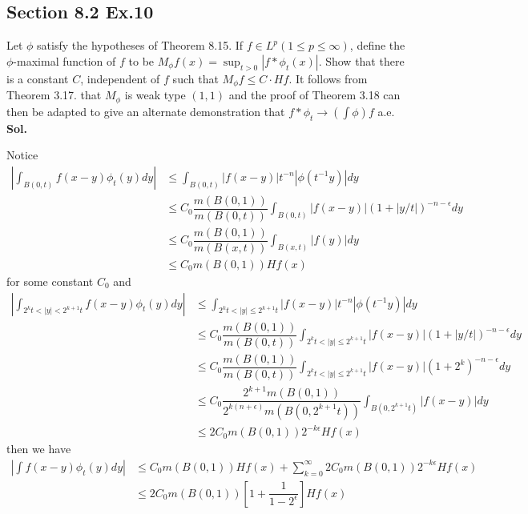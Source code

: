 \documentclass[lang=en,11pt,a4paper,citestyle =authoryear]{elegantpaper}
\begin{document}
\subsection*{Section 8.2 Ex.10} 
Let $\phi$ satisfy the hypotheses of Theorem 8.15. If $f\in L^p(1\leq p \leq \infty)$, define the $\phi$-maximal function of $f$ to be $M_{\phi}f(x) = \sup_{t>0}|f*\phi_t(x)|$.  Show that there is a constant $C$, independent of $f$ such that $M_{\phi}f \leq C\cdot Hf$. It follows from Theorem 3.17. that $M_{\phi}$ is weak type $(1,1)$ and the proof of Theorem 3.18 can then be adapted to give an alternate demonstration that $f*\phi_t \to (\int \phi)f$ a.e. 
\vspace{0.5em}\\
\textbf{Sol.} \par
Notice
\[
\begin{aligned}
|\int_{B(0,t)}f(x-y)\phi_t(y)dy| &\leq \int_{B(0,t)} |f(x-y)|t^{-n} |\phi(t^{-1}y)| dy \\
& \leq C_0\dfrac{m(B(0,1))}{m(B(0,t))} \int_{B(0,t)} |f(x-y)|(1+|y/t|)^{-n-\epsilon} dy \\
& \leq C_0\dfrac{m(B(0,1))}{m(B(x,t))} \int_{B(x,t)} |f(y)|dy \\
&\leq  C_0m(B(0,1)) Hf(x)
\end{aligned}
\]
for some constant $C_0$ and
\[
\begin{aligned}
|\int_{2^kt < |y| < 2^{k+1}t}f(x-y)\phi_t(y)dy| &\leq \int_{2^kt < |y| \leq 2^{k+1}t}|f(x-y)|t^{-n} |\phi(t^{-1}y)| dy \\
& \leq C_0\dfrac{m(B(0,1))}{m(B(0,t))} \int_{2^kt < |y| \leq 2^{k+1}t} |f(x-y)|(1+|y/t|)^{-n-\epsilon} dy \\
& \leq C_0\dfrac{m(B(0,1))}{m(B(0,t))} \int_{2^kt < |y| \leq 2^{k+1}t} |f(x-y)|(1+2^k)^{-n-\epsilon} dy \\
& \leq C_0\dfrac{2^{k+1}m(B(0,1))}{2^{k(n+\epsilon)}m(B(0,2^{k+1}t))} \int_{B(0,2^{k+1}t)} |f(x-y)|dy \\
&\leq  2C_0m(B(0,1))2^{-k\epsilon} Hf(x)
\end{aligned}
\]
then we have
\[
\begin{aligned}
|\int f(x-y)\phi_t(y)dy| &\leq C_0m(B(0,1)) Hf(x) + \sum\limits_{k=0}^{\infty} 2C_0m(B(0,1))2^{-k\epsilon} Hf(x) \\&\leq 2C_0m(B(0,1))[1+\dfrac{1}{1-2^{\epsilon}}]Hf(x)
\end{aligned}
\]
\vspace{0.5em}
\end{document}
